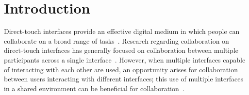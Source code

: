 \documentclass{bmcart}
\begin{document}
\begin{frontmatter}
\begin{abstractbox}

\begin{keyword}
\end{keyword}


\end{abstractbox}
%

\end{frontmatter}




\section*{Introduction}\label{sec:intro}

Direct-touch interfaces provide an effective digital medium in which people can collaborate on a broad range of tasks~\cite{Davidsen2016}. 
Research regarding collaboration on direct-touch interfaces has generally focused on collaboration between multiple participants across a single interface~\cite{Piper2009,Rick2009,Ryall2006a}. 
However, when multiple interfaces capable of interacting with each
other are used, an opportunity arises for collaboration between users interacting with different interfaces; this use of multiple interfaces in a shared environment can be beneficial for collaboration~\cite{Wallace2008a,Wallace2009}.
\end{document}

